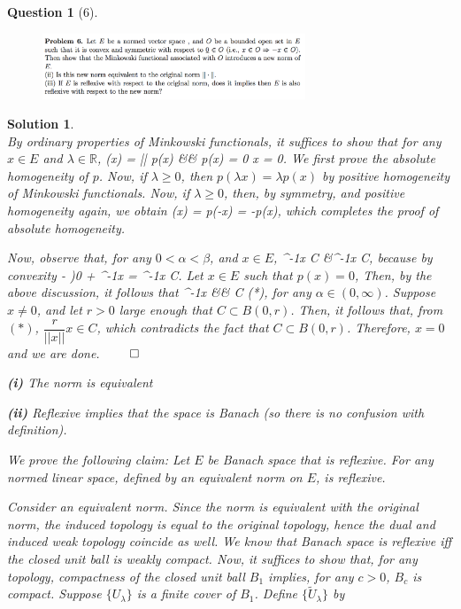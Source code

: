 \documentclass{article} %
\def\eQb#1\eQe{\begin{eqnarray*}#1\end{eqnarray*}}
\theoremstyle{quest}
\newtheorem*{question}{Question}
\newtheorem*{solution}{Solution}
\begin{document}
\begin{question}[6]
\hfill
\begin{figure}[h!]
  \centering
    \includegraphics[width=0.7\textwidth]{funcA-h-e1-p6.png}
\end{figure}
\end{question}
\begin{solution} \hfill \\
By ordinary properties of Minkowski functionals, it suffices to show that
for any $x \in E$ and $\lambda \in \mathbb{R}$,
\eQb
p(\lambda x) = |\lambda| p(x) \>\> && \>\>
p(x) = 0 \implies x = 0.
\eQe
We first prove the absolute homogeneity of $p$.
Now, if $\lambda \geq 0$,
then $p(\lambda x) = \lambda p(x)$ by positive homogeneity of Minkowski functionals.
Now, if $\lambda \geq 0$, then, by symmetry, and positive homogeneity again,
we obtain
\eQb
p(\lambda x) = p(-\lambda x) = -\lambda p(x), 
\eQe
which completes the proof of absolute homogeneity. 

\bigskip

Now, observe that, for any $0 <\alpha < \beta$, and $x \in E$, 
\eQb
\alpha^{-1}x \in C &\implies \beta^{-1}x \in C,
\eQe
because by convexity
\eQb
(1- )0 + \alpha^{-1}x
= \beta^{-1}x \in C.
\eQe
Let $x \in E$ such that $p(x) = 0$, Then, by the above discussion,
it follows that
\eQb
\alpha^{-1}x &\in& C \>\>\> (*),
\eQe
for any $\alpha \in (0,\infty)$. Suppose $x \neq 0$, and let $r > 0$ 
large enough that $C \subset B(0,r)$. Then, it follows that, from $(*)$,
$\dfrac{r}{||x||}x \in C$, which contradicts the fact that $C \subset B(0,r)$.
Therefore, $x = 0$ and we are done. \hfill $\qed$

\bigskip

\textbf{(i)} The norm is equivalent 

\textbf{(ii)} Reflexive implies that the space is Banach (so there is no confusion
with definition). 

We prove the following claim: Let $E$ be Banach space that is reflexive. For
any normed linear space, defined by an equivalent norm on $E$, is reflexive.

\bigskip
Consider an equivalent norm. Since the norm is equivalent with the original norm,
the induced topology is equal to the original topology, 
hence the dual and induced weak topology coincide as well. We know that
Banach space is reflexive iff the closed unit ball is weakly compact. Now,
it suffices to show that, for any topology, compactness of the closed unit ball
$B_1$ implies, for any $c > 0$, $B_c$ is compact. Suppose $\{U_{\lambda}\}$ 
is a finite cover of $B_1$. Define $\{\tilde{U}_{\lambda}\}$ by 

 

\end{solution}
\end{document}
